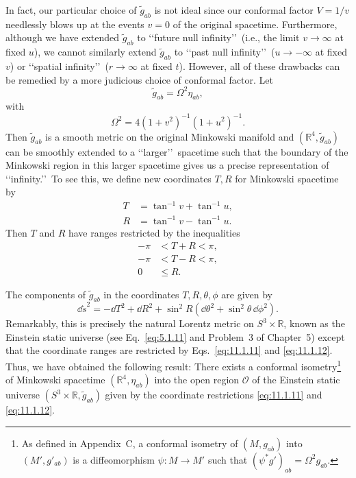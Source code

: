 In fact, our particular choice of \(\tilde g_{ab}\) is not ideal since our conformal
factor \(V=1/v\) needlessly blows up at the events \(v=0\) of the original spacetime.
Furthermore, although we have extended \(\tilde g_{ab}\) to \lq\lq future null
infinity\rq\rq\ (i.e., the limit \(v\to\infty\) at fixed \(u\)), we cannot similarly extend
\(\tilde g_{ab}\) to \lq\lq past null infinity\rq\rq\ (\(u\to-\infty\) at fixed \(v\)) or
\lq\lq spatial infinity\rq\rq\ (\(r\to\infty\) at fixed \(t\)). However, all of these
drawbacks can be remedied by a more judicious choice of conformal factor. Let
\begin{equation}
  \tilde g_{ab}=\Omega^2\eta_{ab},
  \tag{11.1.7}\label{eq:11.1.7}
\end{equation}
with
\begin{equation}
  \Omega^2=4(1+v^2)^{-1}(1+u^2)^{-1}.
  \tag{11.1.8}\label{eq:11.1.8}
\end{equation}
Then \(\tilde g_{ab}\) is a smooth metric on the original Minkowski manifold and
\((\mathbb R^4,\tilde g_{ab})\) can be smoothly extended to a \lq\lq larger\rq\rq\ spacetime
such that the boundary of the Minkowski region in this larger spacetime gives us a
precise representation of \lq\lq infinity.\rq\rq\ To see this, we define new coordinates
\(T,R\) for Minkowski spacetime by
\begin{align}
  T&=\tan^{-1}v+\tan^{-1}u, \tag{11.1.9}\label{eq:11.1.9}\\
  R&=\tan^{-1}v-\tan^{-1}u. \tag{11.1.10}\label{eq:11.1.10}
\end{align}
Then \(T\) and \(R\) have ranges restricted by the inequalities
\begin{align}
  -\pi&<T+R<\pi, \tag{11.1.11}\label{eq:11.1.11}\\
  -\pi&<T-R<\pi, \tag{11.1.12}\label{eq:11.1.12}\\
  0&\leq R. \tag{11.1.13}\label{eq:11.1.13}
\end{align}



The components of \(\tilde g_{ab}\) in the coordinates \(T,R,\theta,\phi\) are given by
\begin{equation}
  \dd\tilde{s}^2=-\dd T^2+\dd R^2+\sin^2R(\dd\theta^2+\sin^2\theta\,\dd\phi^2).
  \tag{11.1.14}\label{eq:11.1.14}
\end{equation}
Remarkably, this is precisely the natural Lorentz metric on \(S^3\times\mathbb R\),
known as the Einstein static universe (see Eq.~\eqref{eq:5.1.11} and Problem~3 of
Chapter~5) except that the coordinate ranges are restricted by
Eqs.~\eqref{eq:11.1.11} and \eqref{eq:11.1.12}. Thus, we have obtained the following
result: There exists a conformal isometry\footnote{As defined in Appendix~C, a
conformal isometry of \((M,g_{ab})\) into \((M',g'_{ab})\) is a diffeomorphism
\(\psi:M\to M'\) such that \((\psi^*g')_{ab}=\Omega^2g_{ab}\).} of Minkowski
spacetime \((\mathbb R^4,\eta_{ab})\) into the open region \(\mathcal O\) of the
Einstein static universe \((S^3\times\mathbb R,\tilde g_{ab})\) given by the
coordinate restrictions \eqref{eq:11.1.11} and \eqref{eq:11.1.12}.

